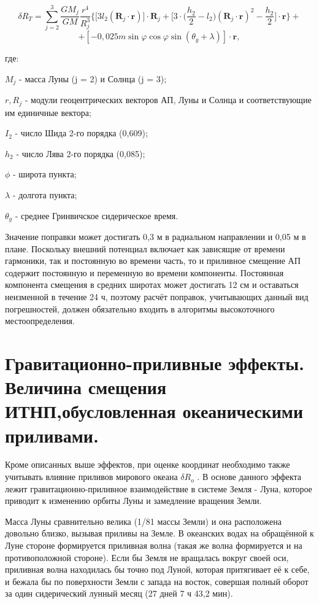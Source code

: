 \documentclass[14pt,a4paper,oneside]{extarticle}
\begin{document}
\[\delta R_T = \sum_{j=2}^{3}\frac{GM_{j}}{GM}\frac{r^{4}}{R_{j}^{3}}\Big\{\Big[3l_{2}(\boldsymbol{R}_{j}\cdot\boldsymbol{r})\Big]\cdot\boldsymbol{R}_{j}+\Big[3\cdot\Big(\frac{h_{2}}{2}-l_{2}\Big)(\boldsymbol{R}_{j}\cdot\boldsymbol{r})^{2}-\frac{h_{2}}{2}\Big]\cdot\boldsymbol{r}\Big\}+\]
\[+\left[-0{,}025m\sin\varphi\cos\varphi\sin(\theta_g+\lambda)\right]\cdot\boldsymbol{r},\]

где:

$M_j$ - масса Луны (j = 2) и Солнца (j = 3);

$r, R_j$ - модули геоцентрических векторов АП, Луны и Солнца и соответствующие им единичные вектора;

$I_2$ - число Шида 2-го порядка (0,609); 

$h_2$ - число Лява 2-го порядка (0,085); 

$\phi$ - широта пункта;

$\lambda$ - долгота пункта;

$\theta_g$ - среднее Гринвичское сидерическое время.

Значение поправки может достигать 0,3 м в радиальном направлении и 0,05 м в плане. Поскольку внешний потенциал включает как зависящие от времени гармоники, так и постоянную во времени часть, то и приливное смещение АП содержит постоянную и переменную во времени компоненты. Постоянная компонента смещения в средних широтах может достигать 12 см и оставаться неизменной в течение 24 ч, поэтому расчёт поправок, учитывающих данный вид погрешностей, должен обязательно входить в алгоритмы высокоточного местоопределения.

\section{Гравитационно-приливные эффекты. Величина смещения ИТНП,обусловленная океаническими приливами.}

Кроме описанных выше эффектов, при оценке координат необходимо также учитывать влияние приливов мирового океана $ \delta R_o $ . В основе данного эффекта лежит гравитационно-приливное взаимодействие в системе Земля - Луна, которое приводит к изменению орбиты Луны и замедление вращения Земли.

Масса Луны сравнительно велика (1/81 массы Земли) и она расположена довольно близко, вызывая приливы на Земле. В океанских водах на обращённой к Луне стороне формируется приливная волна (такая же волна формируется и на противоположной стороне).
Если бы Земля не вращалась вокруг своей оси, приливная волна находилась бы точно под Луной, которая притягивает её к себе, и бежала бы по поверхности Земли с запада на восток, совершая полный оборот за один сидерический лунный месяц (27 дней 7 ч 43,2 мин).
\end{document}
